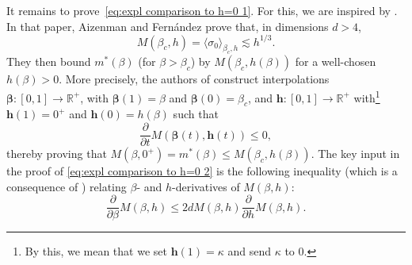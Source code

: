 \documentclass[11pt,a4paper]{article}
\numberwithin{equation}{section}
\theoremstyle{plain}
\theoremstyle{definition}
\begin{document}
It remains to prove~\eqref{eq:expl comparison to h=0 1}. For this, we are inspired by \cite{AizenmanFernandezCriticalBehaviorMagnetization1986}. In that paper, Aizenman and Fern\'andez prove that, in dimensions $d>4$,
\begin{equation}
	M(\beta_c,h)=\langle \sigma_0\rangle_{\beta_c,h}\lesssim h^{1/3}.
\end{equation}
They then bound $m^*(\beta)$ (for $\beta>\beta_c$) by $M(\beta_c,h(\beta))$ for a well-chosen $h(\beta)>0$. More precisely, the authors of \cite{AizenmanFernandezCriticalBehaviorMagnetization1986} construct interpolations $\boldsymbol{\beta}:[0,1]\rightarrow \mathbb R^+$, with $\boldsymbol{\beta}(1)=\beta$ and $\boldsymbol{\beta}(0)=\beta_c$, and $\boldsymbol{h}:[0,1]\rightarrow \mathbb R^+$ with\footnote{By this, we 
mean that we set $\boldsymbol{h}(1)=\kappa$ and send $\kappa$ to $0$.}  $\boldsymbol{h}(1)=0^+$ and $\boldsymbol{h}(0)=h(\beta)$ such that
\begin{equation}\label{eq:expl comparison to h=0 2}
	\frac{\partial}{\partial t}M(\boldsymbol{\beta}(t),\boldsymbol{h}(t))\leq 0,
\end{equation} 
thereby proving that 
$M(\beta,0^+)=m^*(\beta)\leq M(\beta_c,h(\beta))$. The key input in the proof of \eqref{eq:expl comparison to h=0 2} is the following inequality (which is a consequence of \cite{GriffithsHurstShermanConcavity1970}) relating $\beta$- and $h$-derivatives of $M(\beta,h)$:
\begin{equation}\label{eq:expl comparison to h=0 2.5}
	\frac{\partial}{\partial \beta}M(\beta,h)\leq 2d M(\beta,h)\frac{\partial}{\partial h}M(\beta,h).
\end{equation}
\end{document}
